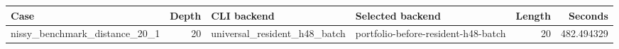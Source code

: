 {\small
\begin{tabular}{lrllrr}
\hline
Case & Depth & CLI backend & Selected backend & Length & Seconds \\
\hline
nissy\_benchmark\_distance\_20\_1 & 20 & universal\_resident\_h48\_batch & portfolio-before-resident-h48-batch & 20 & 482.494329 \\
\hline
\end{tabular}
}
